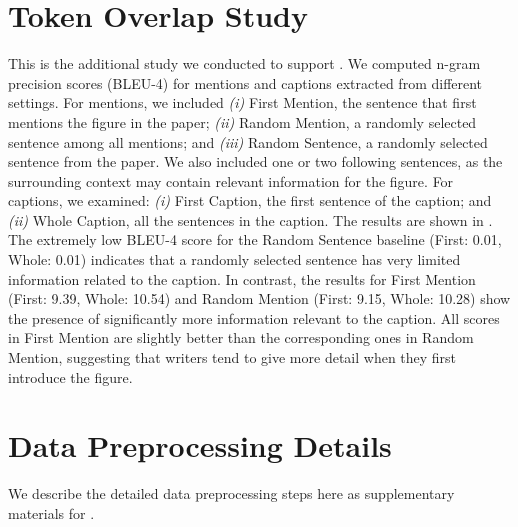 

\section{Token Overlap Study}
\label{sec:token-overlap-study} 
This is the additional study we conducted to support .
We computed n-gram precision scores (BLEU-4) for mentions and captions
extracted from different settings.
For mentions, we included 
{\em (i)} First Mention, the sentence that first mentions the figure in the paper;
{\em (ii)} Random Mention, a randomly selected sentence among all mentions;
and 
{\em (iii)} Random Sentence, a randomly selected sentence from the paper.
We also included one or two following sentences, as the surrounding context may contain relevant information for the figure. 
For captions, we examined: 
{\em (i)} First Caption, the first sentence of the caption; 
and {\em (ii)} Whole Caption, all the sentences in the caption. 
The results are shown in . 
The extremely low BLEU-4 score for the Random Sentence baseline (First: 0.01, Whole: 0.01) indicates 
that a randomly selected sentence has very limited information related to the caption.
In contrast, the results for First Mention (First: 9.39, Whole: 10.54) and Random Mention (First: 9.15, Whole: 10.28) show 
the presence of significantly more information relevant to the caption.
All scores in First Mention are slightly better than the corresponding ones in Random Mention, 
suggesting that writers tend to give more detail when they first introduce the figure.





% 


\section{Data Preprocessing Details}
\label{sec:appendix-data-preprocessing}
We describe the detailed data preprocessing steps here as supplementary materials for .

